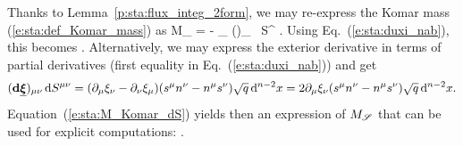 Thanks to Lemma~\ref{p:sta:flux_integ_2form}, we may re-express the Komar mass
(\ref{e:sta:def_Komar_mass}) as
\be \label{e:sta:M_Komar_dS}
   M_{\Sp} = -   \int_{\Sp} (\dd \uu{\xi})_{\mu\nu} \,  \D S^{\mu\nu} .
\ee
Using Eq.~(\ref{e:sta:duxi_nab}), this becomes
\be \label{e:sta:Komar_mass_flux_nabla_xi}
     .
\ee
Alternatively, we may express the exterior derivative in terms of
partial derivatives (first equality in Eq.~(\ref{e:sta:duxi_nab})) and get
\[
    (\mathbf{d} \underline{\bm{\xi}})_{\mu\nu} \,  \mathrm{d} S^{\mu\nu} =
    (\partial_\mu \xi_\nu - \partial_\nu \xi_\mu)
    (s^\mu n^\nu - n^\mu s^\nu) \sqrt{q}\, \mathrm{d}^{n-2} x
    = 2 \partial_\mu \xi_\nu  (s^\mu  n^\nu - n^\mu  s^\nu)
    \sqrt{q}\, \mathrm{d}^{n-2} x  .
\]
Equation~(\ref{e:sta:M_Komar_dS}) yields then an expression of $M_{\mathscr{S}}$ that
can be used for explicit computations:
\be \label{e:sta:M_Komar_partial_der}
     .
\ee

